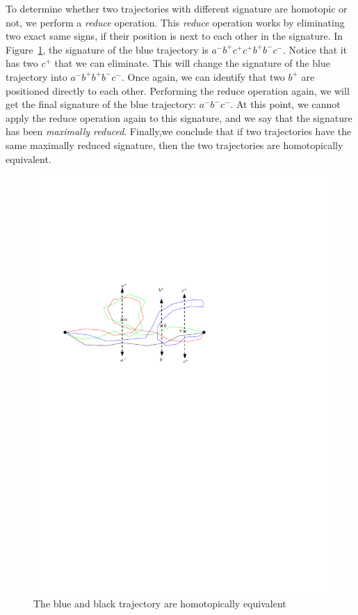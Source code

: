 To determine whether two trajectories with different signature are homotopic or not, we perform a \textit{reduce} operation.
This \textit{reduce} operation works by eliminating two exact same signs, if their position is next to each other in the signature.
In Figure~\ref{fig:diff_sign}, the signature of the blue trajectory is \textit{$a^{-}b^{+}c^{+}c^{+}b^{+}b^{-}c^{-}$}.
Notice that it has two \textit{$c^{+}$} that we can eliminate.
This will change the signature of the blue trajectory into \textit{$a^{-}b^{+}b^{+}b^{-}c^{-}$}.
Once again, we can identify that two \textit{$b^{+}$} are positioned directly to each other. 
Performing the reduce operation again, we will get the final signature of the blue trajectory: \textit{$a^{-}b^{-}c^{-}$}.
At this point, we cannot apply the reduce operation again to this signature, and we say that the signature has been \textit{maximally reduced}.
Finally,we conclude that if two trajectories have the same maximally reduced signature, then the two trajectories are homotopically equivalent.  

\begin{figure}
\centering
\includegraphics[scale=1]{Gambar/diff_sign}
\caption[The blue and black trajectory are homotopically equivalent \cite{Lionov:2009}]{The blue and black trajectory are homotopically equivalent \cite{Lionov:2009}} 
\label{fig:diff_sign}
\end{figure}

